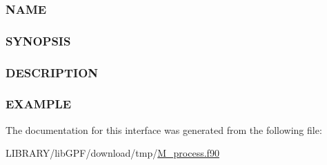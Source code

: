 \subsubsection*{N\+A\+ME}

\subsubsection*{S\+Y\+N\+O\+P\+S\+IS}

\subsubsection*{D\+E\+S\+C\+R\+I\+P\+T\+I\+ON}

\subsubsection*{E\+X\+A\+M\+P\+LE}

The documentation for this interface was generated from the following file\+:\begin{DoxyCompactItemize}
\item 
L\+I\+B\+R\+A\+R\+Y/lib\+G\+P\+F/download/tmp/\hyperlink{M__process_8f90}{M\+\_\+process.\+f90}\end{DoxyCompactItemize}
